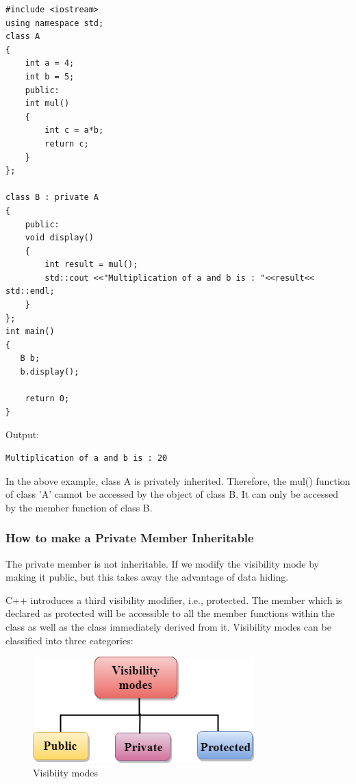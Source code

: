 \documentclass{book}
\begin{document}
\begin{lstlisting} 
#include <iostream>  
using namespace std;  
class A  
{  
    int a = 4;  
    int b = 5;  
    public:  
    int mul()  
    {  
        int c = a*b;  
        return c;  
    }     
};  
  
class B : private A  
{  
    public:  
    void display()  
    {  
        int result = mul();  
        std::cout <<"Multiplication of a and b is : "<<result<< std::endl;  
    }  
};  
int main()  
{  
   B b;  
   b.display();  
  
    return 0;  
}  
\end{lstlisting}

Output:

\begin{verbatim}
Multiplication of a and b is : 20
\end{verbatim}

In the above example, class A is privately inherited. Therefore, the mul() function of class 'A' cannot be accessed by the object of class B. It can only be accessed by the member function of class B.

\subsubsection{How to make a Private Member Inheritable}

The private member is not inheritable. If we modify the visibility mode by making it public, but this takes away the advantage of data hiding.

C++ introduces a third visibility modifier, i.e., protected. The member which is declared as protected will be accessible to all the member functions within the class as well as the class immediately derived from it. Visibility modes can be classified into three categories:

\begin{figure}[h]
\centering 
\includegraphics[width=\columnwidth]{visibillity-of-the-code}%
\caption{Visibiity modes}%
\label{}%
\end{figure}
\end{document}
